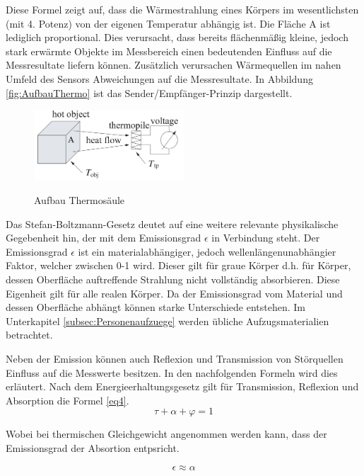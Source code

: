 Diese Formel zeigt auf, dass die Wärmestrahlung eines Körpers im wesentlichsten (mit 4. Potenz) von der eigenen Temperatur abhängig ist. Die Fläche A ist lediglich proportional. Dies verursacht, dass bereits flächenmäßig kleine, jedoch stark erwärmte Objekte im Messbereich einen bedeutenden Einfluss auf die Messresultate liefern können. Zusätzlich verursachen Wärmequellen im nahen Umfeld des Sensors Abweichungen auf die Messresultate. In Abbildung \ref{fig:AufbauThermo} ist das Sender/Empfänger-Prinzip dargestellt.

\begin{figure}[H]
	\centering
	\includegraphics[width=0.5\textwidth]
	{fig/seebeck2.PNG}
	\caption[Aufbau Thermosäule]{Aufbau Thermosäule} \protect\cite{seebeck}
	\label{fig:thermosäule}
\end{figure}


Das Stefan-Boltzmann-Gesetz deutet auf eine weitere relevante physikalische Gegebenheit hin, der mit dem Emissionsgrad $\epsilon$  in Verbindung steht. Der Emissionsgrad $\epsilon$ ist ein materialabhängiger, jedoch wellenlängenunabhängier Faktor, welcher zwischen 0-1  wird. Dieser gilt für graue Körper d.h. für Körper, dessen Oberfläche auftreffende Strahlung nicht vollständig absorbieren. Diese Eigenheit gilt für alle realen Körper. Da der Emissionsgrad vom Material und dessen Oberfläche abhängt können starke Unterschiede entstehen. Im Unterkapitel \ref{subsec:Personenaufzuege} werden übliche Aufzugsmaterialien betrachtet.

Neben der Emission können auch Reflexion und Transmission von Störquellen Einfluss auf die Messwerte besitzen. In den nachfolgenden Formeln wird dies erläutert. Nach dem Energieerhaltungsgesetz \protect\cite{Thermoformeln} gilt für Transmission, Reflexion und Absorption die Formel \ref{eq4}.
\begin{equation}
\label{eq4}
\tau  + \alpha + \varphi  = 1
\end{equation}

Wobei bei thermischen Gleichgewicht angenommen werden kann, dass der Emissionsgrad der Absortion entpsricht.

\begin{equation}
\label{eq5}
\epsilon \approx  \alpha
\end{equation}


